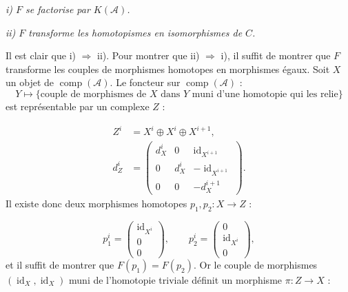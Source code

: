 \clearpage
{}%
\begingroup\small\setlength{\parskip}{0pt}\setlength{\emergencystretch}{1.5em}
\setlength{\abovedisplayskip}{4pt plus 2pt minus 2pt}%
\setlength{\belowdisplayskip}{4pt plus 2pt minus 2pt}%

\noindent\textit{i) $F$ se factorise par $K(\mathcal A)$.}

\noindent\textit{ii) $F$ transforme les homotopismes en isomorphismes de
$C$.}

Il est clair que i) $\Rightarrow$ ii). Pour montrer que ii)
$\Rightarrow$ i), il suffit de montrer que $F$ transforme les couples de
morphismes homotopes en morphismes égaux. Soit $X$ un objet de
$\operatorname{comp}(\mathcal A)$. Le foncteur sur
$\operatorname{comp}(\mathcal A)$ :
\[
Y\longmapsto
\{\text{couple de morphismes de $X$ dans $Y$ muni d'une homotopie qui les
relie}\}
\]
est représentable par un complexe $Z$ :

\begin{equation}
\begin{aligned}
Z^i&=X^i\oplus X^i\oplus X^{i+1},\\[2pt]
d_Z^i&=
\begin{pmatrix}
d_X^i&0&\operatorname{id}_{X^{i+1}}\\
0&d_X^i&-\operatorname{id}_{X^{i+1}}\\
0&0&-d_X^{i+1}
\end{pmatrix}.
\end{aligned}
\tag{1.3.6.1}
\end{equation}
Il existe donc deux morphismes homotopes
$p_1,p_2\colon X\longrightarrow Z$ :

\begin{equation}
p_1^i=
\begin{pmatrix}
\operatorname{id}_{X^i}\\0\\0
\end{pmatrix},
\qquad
p_2^i=
\begin{pmatrix}
0\\\operatorname{id}_{X^i}\\0
\end{pmatrix},
\tag{1.3.6.2}
\end{equation}
et il suffit de montrer que $F(p_1)=F(p_2)$. Or le couple de morphismes
$(\operatorname{id}_X,\operatorname{id}_X)$ muni de l'homotopie triviale
définit un morphisme $\pi\colon Z\longrightarrow X$ :


